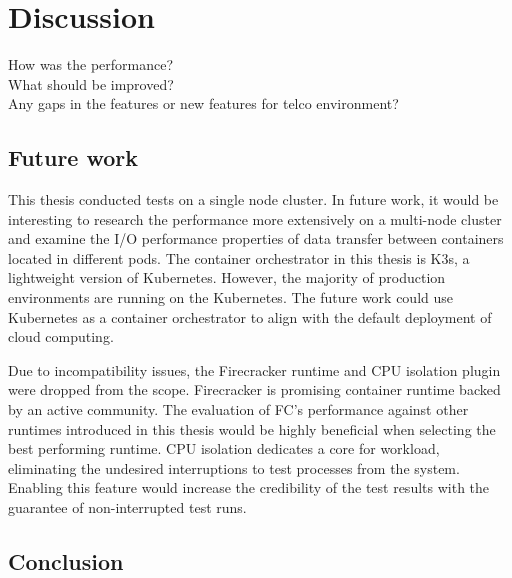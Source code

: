 \chapter{Discussion}
\label{chapter:discussion}

How was the performance? \\
What should be improved? \\
Any gaps in the features or new features for telco environment? \\

\section{Future work}

This thesis conducted tests on a single node cluster. In future work, it would be interesting to research the performance more extensively on a multi-node cluster and examine the I/O performance properties of data transfer between containers located in different pods. The container orchestrator in this thesis is K3s, a lightweight version of Kubernetes. However, the majority of production environments are running on the Kubernetes. The future work could use Kubernetes as a container orchestrator to align with the default deployment of cloud computing.

Due to incompatibility issues, the Firecracker runtime and CPU isolation plugin were dropped from the scope. Firecracker is promising container runtime backed by an active community. The evaluation of FC's performance against other runtimes introduced in this thesis would be highly beneficial when selecting the best performing runtime. CPU isolation dedicates a core for workload, eliminating the undesired interruptions to test processes from the system. Enabling this feature would increase the credibility of the test results with the guarantee of non-interrupted test runs.

\section{Conclusion}